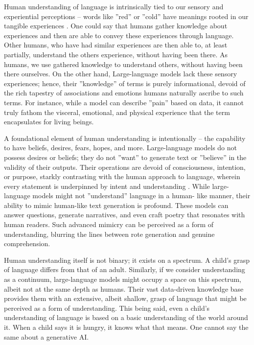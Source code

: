 \documentclass{article}
\begin{document}
Human understanding of language is intrinsically tied to our sensory and experiential perceptions – words like ”red” or ”cold” have meanings rooted in our
tangible experiences \cite{barsalou2008grounded}.
One could say that humans gather knowledge about experiences and then are able to convey these experiences through language. Other humans, who have had similar experiences are then able to, at least partially, understand the others experience, without having been there. As humans, we use gathered knowledge to understand others, without having been there ourselves. On the other hand, Large-language models lack these sensory experiences; hence, their ”knowledge” of terms is purely informational, devoid of the rich
tapestry of associations and emotions humans naturally ascribe to such terms.
For instance, while a model can describe ”pain” based on data, it cannot truly
fathom the visceral, emotional, and physical experience that the term encapsulates for living beings.

A foundational element of human understanding is intentionally – the capability to have beliefs, desires, fears, hopes, and more. Large-language models do
not possess desires or beliefs; they do not ”want” to generate text or ”believe”
in the validity of their outputs. Their operations are devoid of consciousness,
intention, or purpose, starkly contrasting with the human approach to language,
wherein every statement is underpinned by intent and understanding \cite{searle1980minds}.
While large-language models might not ”understand” language in a human-
like manner, their ability to mimic human-like text generation is profound.
These models can answer questions, generate narratives, \cite{radford2019language} and even craft poetry
that resonates with human readers. Such advanced mimicry can be perceived as
a form of understanding, blurring the lines between rote generation and genuine
comprehension.

    
Human understanding itself is not binary; it exists on a spectrum. A child’s
grasp of language differs from that of an adult. Similarly, if we consider understanding as a continuum, large-language models might occupy a space on
this spectrum, albeit not at the same depth as humans. Their vast data-driven
knowledge base provides them with an extensive, albeit shallow, grasp of language that might be perceived as a form of understanding. This being said, even a child's understanding of language is based on a basic understanding of the world around it. When a child says it is hungry, it knows what that means. One cannot say the same about a generative AI.
\end{document}
